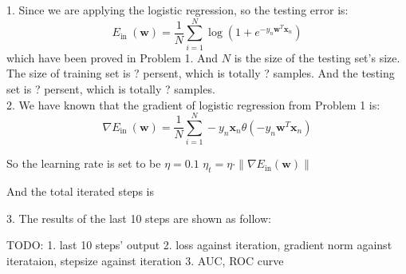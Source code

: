 1. Since we are applying the logistic regression, so the testing error is:
$$E_{\text {in }}(\mathbf{w}) = \dfrac{1}{N}\sum_{i=1}^{N}\log (1+e^{-y_n\mathbf{w}^T\mathbf{x}_n})$$
which have been proved in Problem 1. And $N$ is the size of the testing set's size.\\

The size of training set is ? persent, which is totally ? samples. And the testing set is ? persent, which is totally ? samples.\\

2. We have known that the gradient of logistic regression from Problem 1 is:
$$\nabla E_{\text {in }}(\mathbf{w}) = \dfrac{1}{N}\sum_{i=1}^{N}-y_n\mathbf{x}_n\theta(-y_n\mathbf{w}^T\mathbf{x}_n)$$

So the learning rate is set to be
$\eta = 0.1$
$\eta_t = \eta\cdot \|\nabla E_{\text{in}}(\mathbf{w})\|$

And the total iterated steps is 


3. The results of the last 10 steps are shown as follow:



TODO:
1. last 10 steps' output
2. loss against iteration, gradient norm against iterataion, stepsize against iteration
3. AUC, ROC curve







